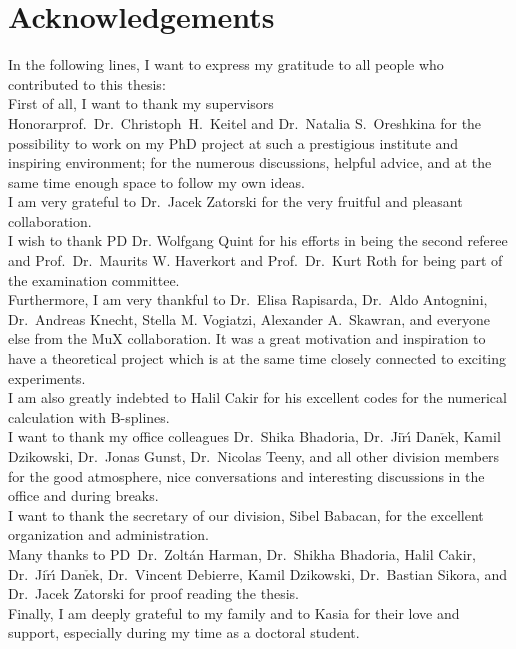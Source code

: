 \chapter*{Acknowledgements}

In the following lines, I want to express my gratitude to all people who contributed to this thesis:\\
First of all, I want to thank my supervisors Honorarprof.~Dr.~Christoph~H.~Keitel and Dr.~Natalia S.~Oreshkina for the possibility to work on my PhD project at such a prestigious institute and inspiring environment; for the numerous discussions, helpful advice, and at the same time enough space to follow my own ideas.\\
I am very grateful to Dr.~Jacek Zatorski for the very fruitful and pleasant collaboration.\\
I wish to thank PD Dr. Wolfgang Quint for his efforts in being the second referee and Prof.~Dr.~Maurits W. Haverkort and Prof.~Dr.~Kurt Roth for being part of the examination committee.\\
Furthermore, I am very thankful to Dr.~Elisa Rapisarda, Dr.~Aldo Antognini, Dr.~Andreas Knecht, Stella M. Vogiatzi, Alexander A.~Skawran, and everyone else from the MuX collaboration. It was a great motivation and inspiration to have a theoretical project which is at the same time closely connected to exciting experiments.\\
I am also greatly indebted to Halil Cakir for his excellent codes for the numerical calculation with B-splines.\\
I want to thank my  office colleagues Dr.~Shika Bhadoria, Dr.~Ji$\check{\text{r}}${\'\i} Dan$\check{\text{e}}$k, Kamil Dzikowski, Dr.~Jonas Gunst, Dr.~Nicolas Teeny, and all other division members for the good atmosphere, nice conversations and interesting discussions in the office and during breaks.\\
I want to thank the secretary of our division, Sibel Babacan, for the excellent organization and administration.\\
Many thanks to PD~Dr.~Zoltán Harman, Dr.~Shikha Bhadoria,  Halil Cakir, Dr.~Ji$\check{\text{r}}${\'\i} Dan$\check{\text{e}}$k, Dr.~Vincent Debierre, Kamil Dzikowski, Dr.~Bastian Sikora, and Dr.~Jacek Zatorski for proof reading the thesis.\\%
Finally, I am deeply grateful to my family and to Kasia for their love and support, especially during my time as a doctoral student.
%



